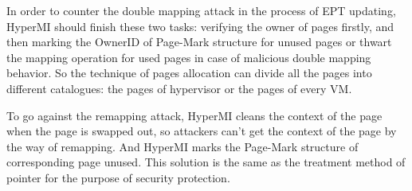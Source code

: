 \documentclass[conference]{IEEEtran}
\begin{document}
%
%
%

In order to counter the double mapping attack in the process of EPT updating, HyperMI should finish these two tasks: verifying the owner of pages firstly, and then marking the OwnerID of Page-Mark structure for unused pages or thwart the mapping operation for used pages in case of malicious double mapping behavior. So the technique of pages allocation can divide all the pages into different catalogues: the pages of hypervisor or the pages of every VM.

To go against the remapping attack, HyperMI cleans the context of the page when the page is swapped out, so attackers can't get the context of the page by the way of remapping. And HyperMI marks the Page-Mark structure of corresponding page unused. This solution is the same as the treatment method of pointer for the purpose of security protection. 
\end{document}
